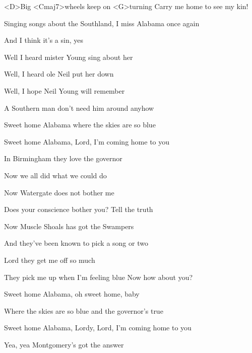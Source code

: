 

\zs
<D>Big <Cmaj7>wheels keep on <G>turning
Carry me home to see my kin!

Singing songs about the Southland,
I miss Alabama once again

And I think it's a sin, yes
\ks

\zs
Well I heard mister Young sing about her

Well, I heard ole Neil put her down

Well, I hope Neil Young will remember

A Southern man don't need him around anyhow
\ks

\zr
Sweet home Alabama
where the skies are so blue

Sweet home Alabama,
Lord, I'm coming home to you
\kr

\zs
In Birmingham they love the governor

Now we all did what we could do

Now Watergate does not bother me

Does your conscience bother you?
Tell the truth
\ks

\zr \kr

\zs
Now Muscle Shoals has got the Swampers

And they've been known to pick a song or two

Lord they get me off so much

They pick me up when I'm feeling blue
Now how about you?
\ks

\zr \kr

\zr
Sweet home Alabama,
oh sweet home, baby

Where the skies are so blue
and the governor's true
\kr

\zr
Sweet home Alabama, Lordy, Lord, I'm coming home to you

Yea, yea Montgomery's got the answer
\kr

\kp
